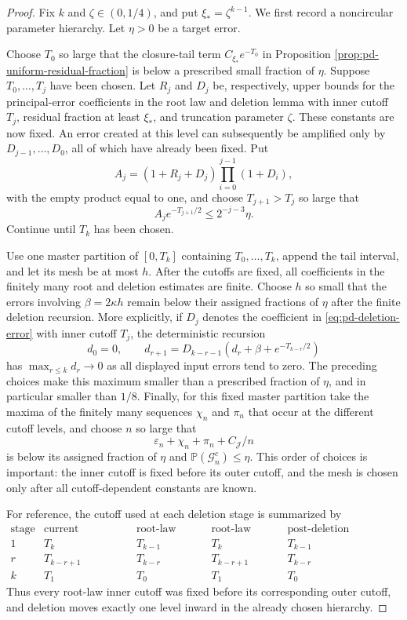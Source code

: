 \documentclass[11pt]{article}
\theoremstyle{remark}
\newcommand{\Pp}{\mathbb P}
\begin{document}
\begin{proof}
Fix $k$ and $\zeta\in(0,1/4)$, and put
$\xi_*=\zeta^{k-1}$.  We first record a noncircular parameter hierarchy.
Let $\eta>0$ be a target error.

Choose $T_0$ so large that the closure-tail term
$C_{\xi_*}e^{-T_0}$ in Proposition
\ref{prop:pd-uniform-residual-fraction} is below a prescribed small fraction of
$\eta$.  Suppose $T_0,\ldots,T_j$ have been chosen.  Let $R_j$ and $D_j$ be,
respectively, upper bounds for the principal-error coefficients in the root law
and deletion lemma with inner cutoff $T_j$, residual fraction at least
$\xi_*$, and truncation parameter $\zeta$.  These constants are now fixed.  An
error created at this level can subsequently be amplified only by
$D_{j-1},\ldots,D_0$, all of which have already been fixed.  Put
\[
        A_j=(1+R_j+D_j)\prod_{i=0}^{j-1}(1+D_i),
\]
with the empty product equal to one, and choose $T_{j+1}>T_j$ so large that
\[
        A_je^{-T_{j+1}/2}\le 2^{-j-3}\eta.
\]
Continue until $T_k$ has been chosen.

Use one master partition of $[0,T_k]$ containing
$T_0,\ldots,T_k$, append the tail interval, and let its mesh be at most $h$.
After the cutoffs are fixed, all coefficients in the finitely many root and
deletion estimates are finite.  Choose $h$ so small that the errors involving
$\beta=2\kappa h$ remain below their assigned fractions of $\eta$ after the
finite deletion recursion.  More explicitly, if $D_j$ denotes the coefficient
in \eqref{eq:pd-deletion-error} with inner cutoff $T_j$, the deterministic
recursion
\[
        d_0=0,\qquad
        d_{r+1}=D_{k-r-1}(d_r+\beta+e^{-T_{k-r}/2})
\]
has $\max_{r\le k}d_r\to0$ as all displayed input errors tend to zero.
The preceding choices make this maximum smaller than a prescribed fraction of
$\eta$, and in particular smaller than $1/8$.  Finally, for this fixed master
partition take the maxima of the finitely many sequences $\chi_n$ and $\pi_n$
that occur at the different cutoff levels, and choose $n$ so large that
\[
        \varepsilon_n+\chi_n+\pi_n+C_{\mathcal J}/n
\]
is below its assigned fraction of $\eta$ and
$\Pp(\mathcal G_n^c)\le\eta$.  This order of choices is important: the inner
cutoff is fixed before its outer cutoff, and the mesh is chosen only after all
cutoff-dependent constants are known.

For reference, the cutoff used at each deletion stage is summarized by
\[
\begin{array}{c|c|c|c|c}
\text{stage}&\text{current regularity}&\text{root-law inner}
&\text{root-law outer}&\text{post-deletion regularity}\\ \hline
1&T_k&T_{k-1}&T_k&T_{k-1}\\
r&T_{k-r+1}&T_{k-r}&T_{k-r+1}&T_{k-r}\\
k&T_1&T_0&T_1&T_0
\end{array}
\]
Thus every root-law inner cutoff was fixed before its corresponding outer
cutoff, and deletion moves exactly one level inward in the already chosen
hierarchy.


\end{proof}
\end{document}
